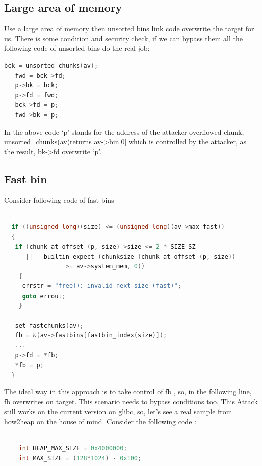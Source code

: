 \documentclass{masterthesis}
\newcommand*\libc{glibc}
\newcommand*\fb{fast bins}
\newcommand*\ub{unsorted bins}
\begin{document}
\subsection{Large area of memory}
Use a large area of memory then \ub{} link code overwrite the target for us. There is some condition and security check, if we can bypass them all the following code of \ub{} do the real job:
\begin{lstlisting}[language=c,frame=tlrb]
  bck = unsorted_chunks(av);
   fwd = bck->fd;
   p->bk = bck;
   p->fd = fwd;
   bck->fd = p;
   fwd->bk = p;
 \end{lstlisting}
In the above code ‘p’ stands for the address of the attacker overflowed chunk, unsorted\_chunks(av)returns av->bin[0] which is controlled by the attacker, as the result, bk->fd overwrite ‘p’.

\subsection{Fast bin}
Consider following code of \fb{}
\begin{lstlisting}[language=c,frame=tlrb]

  if ((unsigned long)(size) <= (unsigned long)(av->max_fast))
  {
   if (chunk_at_offset (p, size)->size <= 2 * SIZE_SZ
      || __builtin_expect (chunksize (chunk_at_offset (p, size))
                 >= av->system_mem, 0))
    {
     errstr = "free(): invalid next size (fast)";
     goto errout;
    }

   set_fastchunks(av);
   fb = &(av->fastbins[fastbin_index(size)]);
   ...
   p->fd = *fb;
   *fb = p;
  }
 \end{lstlisting}
The ideal way in this approach is to take control of fb , so, in the following line, fb overwrites on target. This scenario needs to bypass conditions too. This Attack still works on the current version on \libc{}, so, let's see a real sample from how2heap on the house of mind. Consider the following code : 
\begin{lstlisting}[language=c,frame=tlrb]

	int HEAP_MAX_SIZE = 0x4000000;
	int MAX_SIZE = (128*1024) - 0x100;
\end{lstlisting}
\end{document}
